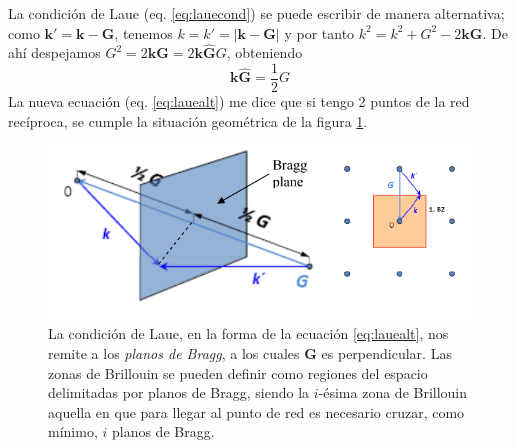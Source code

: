La condición de Laue (eq. \ref{eq:lauecond}) se puede escribir de manera
alternativa; como $\mathbf{k}'=\mathbf{k}-\mathbf{G}$, 
tenemos $k = k' = \vert \mathbf{k} - \mathbf{G}\vert $ 
y por tanto $k^2 = k^2 + G^2 - 2 \mathbf{k}\mathbf{G}$. 
De ahí despejamos $G^2 = 2\mathbf{k}\mathbf{G} =2\mathbf{k} \hat{\mathbf{G}} G$,
obteniendo
\begin{equation}
  \label{eq:lauealt}
  \mathbf{k}\hat { \mathbf{G} } = \frac{1}{2} G
\end{equation}
La nueva ecuación (eq. \ref{eq:lauealt}) me dice que si tengo 2 puntos de la red
recíproca, se cumple la situación geométrica de la figura \ref{fig:bragggeom}.
\begin{figure}
  \centering
  \includegraphics[width=\textwidth]{figures/bragggeom.png}
  \caption{La condición de Laue, en la forma de la ecuación
    \ref{eq:lauealt}, nos remite a los \emph{planos de Bragg},
    a los cuales $\mathbf{G}$ es perpendicular. Las zonas de Brillouin
    se pueden definir como regiones del espacio delimitadas
    por planos de Bragg, siendo la $i$-ésima zona de Brillouin aquella en
    que para llegar al punto de red es necesario cruzar, como mínimo,
    $i$ planos de Bragg.}
  \label{fig:bragggeom}
\end{figure}

